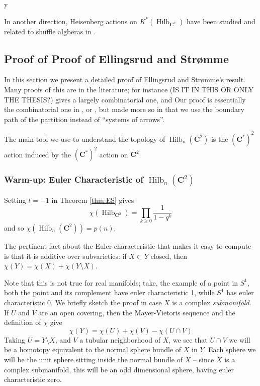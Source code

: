 y\documentclass{amsart}[12pt]
\theoremstyle{definition}
\newcommand{\C}{\mathbf{C}}
\DeclareMathOperator{\Hilb}{Hilb}
\newcommand{\HG}{\Hilb}
\begin{document}
In another direction, Heisenberg actions on $K^*(\HG_{\C^2})$ have been studied and related to shuffle algberas in \cite{FT, SV}.




\subsection{Proof of \texorpdfstring{Proof of Ellingsrud and Str\o mme}{Proof of Ellingsrud and Stromme}}

In this section we present a detailed proof of Ellingsrud and Str\o mme's result.  Many proofs of this are in the literature; for instance \cite{cheah} (IS IT IN THIS OR ONLY THE THESIS?) gives a largely combinatorial one, and \cite{nakajimabook}   Our proof is essentially the combinatorial one in \cite{cheah}, or , but made more so in that we use the boundary path of the partition instead of ``systems of arrows''.  

The main tool we use to understand the topology of $\Hilb_n(\C^2)$ is the $(\C^*)^2$ action induced by the $(\C^*)^2$ action on $\C^2$.  




\subsubsection{Warm-up: Euler Characteristic of $\Hilb_n(\C^2)$}

Setting $t=-1$ in Theorem \ref{thm:ES} gives
$$\chi(\Hilb_{\C^2})=\prod_{k\geq 0} \frac{1}{1-q^k}$$
and so $\chi(\Hilb_n(\C^2))=p(n)$.

The pertinent fact about the Euler characteristic that makes it easy to compute is that it is additive over subvarieties: if $X\subset Y$ closed, then $\chi(Y)=\chi(X)+\chi(Y\setminus X)$.

Note that this is not true for real manifolds; take, the example of a point in $S^1$, both the point and its complement have euler characteristic 1, while $S^1$ has euler characteristic 0.  We briefly sketch the proof in case $X$ is a complex \emph{submanifold}.  If $U$ and $V$ are an open covering, then the Mayer-Vietoris sequence and the definition of $\chi$ give
$$\chi(Y)=\chi(U)+\chi(V)-\chi(U\cap V)$$
Taking $U=Y\setminus X$, and $V$ a tubular neighborhood of $X$, we see that $U\cap V$ we will be a homotopy equivalent to the normal sphere bundle of $X$ in $Y$.  Each sphere we will be the unit sphere sitting inside the normal bundle of $X$ -- since $X$ is a complex submanifold, this will be an odd dimensional sphere, having euler characteristic zero.  
\end{document}
